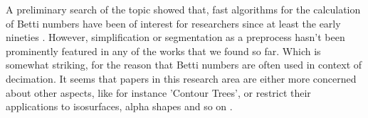 A preliminary search of the topic showed that, fast algorithms for the calculation of Betti numbers have been of interest for researchers since at least the early nineties \citep[cf.][]{Delfinado1993}.
However, simplification or segmentation as a preprocess hasn't been prominently featured in any of the works that we found so far.
Which is somewhat striking, for the reason that Betti numbers are often used in context of decimation.
It seems that papers in this research area are either more concerned about other aspects, like for instance 'Contour Trees', or restrict their applications to isosurfaces, alpha shapes and so on \citep[cf.][]{Pascucci2003, Konkle2003}.


